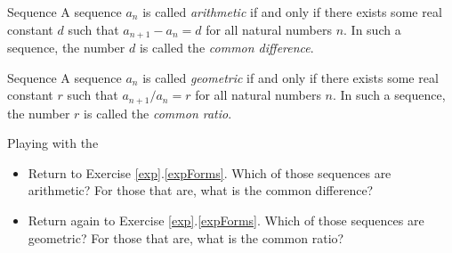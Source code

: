 \begin{definition}{ Sequence}
A sequence $a_n$ is called \emph{arithmetic} if and only if there exists some real constant $d$ such that $a_{n+1}-a_{n}=d$ for all natural numbers $n$.  In such a sequence, the number $d$ is called the \emph{common difference}.
\end{definition}

\begin{definition}{ Sequence}
A sequence $a_n$ is called \emph{geometric} if and only if there exists some real constant $r$ such that $a_{n+1}/a_{n}=r$ for all natural numbers $n$.   In such a sequence, the number $r$ is called the \emph{common ratio}.
\end{definition}

\begin{exercise}{Playing with the  \Coffeecup \Coffeecup}

\begin{itemize}

\item Return to Exercise \ref{exp}.\ref{expForms}.  Which of those sequences are arithmetic?  For those that are, what is the common difference?


\item Return again to Exercise \ref{exp}.\ref{expForms}.  Which of those sequences are geometric?  For those that are, what is the common ratio?


\end{itemize}
\end{exercise}
